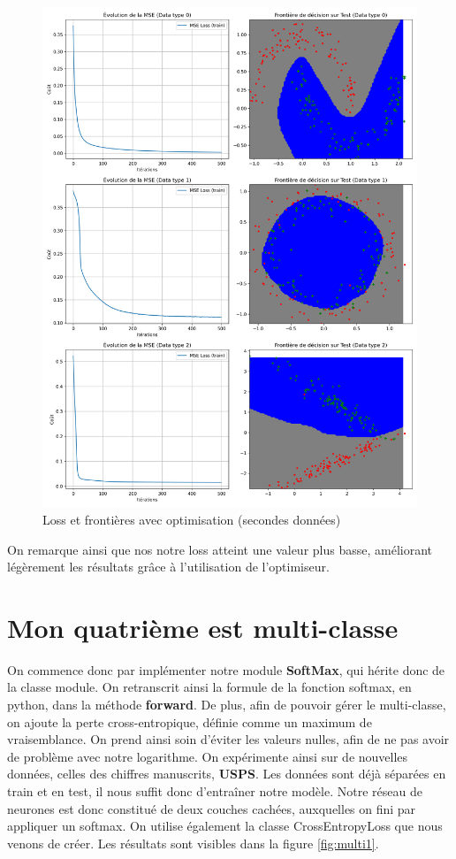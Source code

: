 \documentclass{article}
\begin{document}
\begin{figure}[H]
    \centering
    \includegraphics[width=0.8\linewidth]{Images/optim2.png}
    \caption{Loss et frontières avec optimisation (secondes données)}
	\label{fig:optim2}
\end{figure}

On remarque ainsi que nos notre loss atteint une valeur plus basse, améliorant légèrement les résultats grâce à l'utilisation de l'optimiseur.

\section{Mon quatrième est multi-classe}
On commence donc par implémenter notre module \textbf{SoftMax}, qui hérite donc de la classe module. On retranscrit ainsi la formule de la fonction softmax, en python, dans la méthode \textbf{forward}. De plus, afin de pouvoir gérer le multi-classe, on ajoute la perte cross-entropique, définie comme un maximum de vraisemblance. On prend ainsi soin d'éviter les valeurs nulles, afin de ne pas avoir de problème avec notre logarithme.
On expérimente ainsi sur de nouvelles données, celles des chiffres manuscrits, \textbf{USPS}. Les données sont déjà séparées en train et en test, il nous suffit donc d'entraîner notre modèle. Notre réseau de neurones est donc constitué de deux couches cachées, auxquelles on fini par appliquer un softmax. On utilise également la classe CrossEntropyLoss que nous venons de créer. Les résultats sont visibles dans la figure \ref{fig:multi1}.
\end{document}

